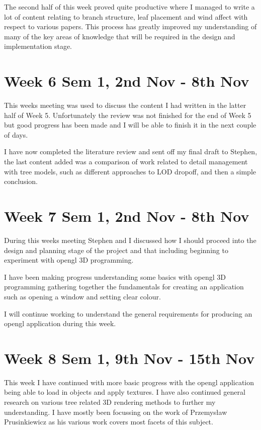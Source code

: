 \documentclass[11pt]{article}
\begin{document}
The second half of this week proved quite productive where I managed to write a lot 
of content relating to branch structure, leaf placement and wind affect with respect 
to various papers. This process has greatly improved my understanding of many of the 
key areas of knowledge that will be required in the design and implementation stage.

\section*{Week 6 Sem 1, 2nd Nov - 8th Nov}
This weeks meeting was used to discuss the content I had written in the latter half of 
Week 5. Unfortunately the review was not finished for the end of Week 5 but good progress 
has been made and I will be able to finish it in the next couple of days.

I have now completed the literature review and sent off my final draft to Stephen, the 
last content added was a comparison of work related to detail management with tree models, 
such as different approaches to LOD dropoff, and then a simple conclusion.

\section*{Week 7 Sem 1, 2nd Nov - 8th Nov}
During this weeks meeting Stephen and I discussed how I should proceed into the design and 
planning stage of the project and that including beginning to experiment with opengl 3D 
programming.

I have been making progress understanding some basics with opengl 3D programming 
gathering together the fundamentals for creating an application such as opening a window and 
setting clear colour. 

I will continue working to understand the general requirements for producing an opengl 
application during this week.

\section*{Week 8 Sem 1, 9th Nov - 15th Nov}
This week I have continued with more basic progress with the opengl application being able 
to load in objects and apply textures. I have also continued general research on various 
tree related 3D rendering methods to further my understanding. I have mostly been focussing 
on the work of Przemysław Prusinkiewicz as his various work covers most facets of this subject.
\end{document}
